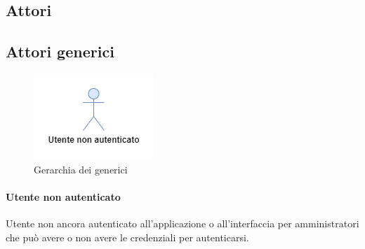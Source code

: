 \subsection{Attori}
\subsection{Attori generici}
\begin{figure}[h]
  \centering
    \includegraphics[scale=0.8]{Sezioni/UseCase/Immagini/Generici.png}
    \caption{Gerarchia dei generici}
\end{figure}

\paragraph{Utente non autenticato}
Utente non ancora autenticato all'applicazione o all'interfaccia per amministratori che può avere o non avere le credenziali per autenticarsi.


